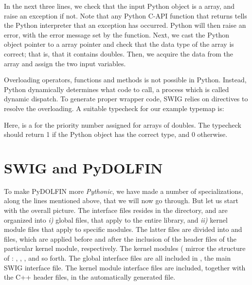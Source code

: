 In the next three lines, we check that the input Python object is a \numpy array, and raise an exception if not.
Note that any Python C-API function that returns  tells the
Python interpreter that an exception has occurred. Python will then raise
an error, with the error message set by the 
function. Next, we cast the Python object pointer to a \numpy array pointer
and check that the data type of the \numpy array is correct; that is, that it contains doubles. Then, we acquire the data from the \numpy array and assign the two input variables.

Overloading operators, functions and methods is not possible in Python.
Instead, Python dynamically determines what code to call,  
a process which is called dynamic dispatch.
To generate proper wrapper code, 
SWIG relies on  directives to resolve the overloading. 
A suitable typecheck for our example typemap is:
Here,  is a  for the priority number assigned for arrays of doubles. The typecheck should return 1 if the Python object  has the correct type, and 0 otherwise.
\section{SWIG and PyDOLFIN}
To make PyDOLFIN more \textit{Pythonic}, we have made a number of
specializations, along the lines mentioned above, that we will now go
through. But let us start with the
overall picture.   
The interface files resides in the  directory, and are
organized into \textit{i)} global files, that apply to the entire \dolfin
library, and \textit{ii)} kernel module files that apply to specific
\dolfin modules. The latter files are divided into 
and  files, which are applied before and after the
inclusion of the header files of the particular kernel module, respectively. 
The kernel modules ( mirror the structure of \dolfin: , , ,  and so forth. The global interface files are all included in , the main SWIG interface file. The kernel module interface files are included, together with the C++ header files, in the automatically generated  file.

